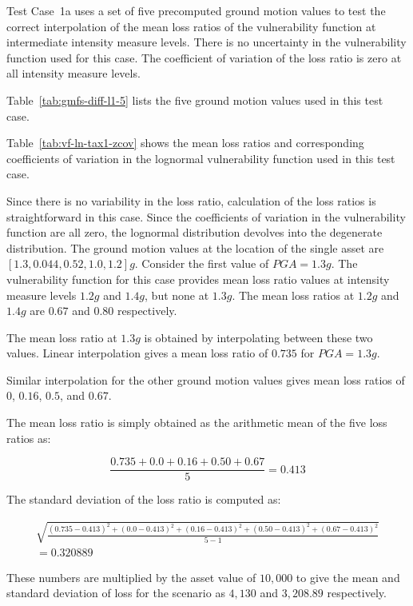 Test Case~1a uses a set of five precomputed ground motion values to test the correct interpolation of the mean loss ratios of the vulnerability function at intermediate intensity measure levels. There is no uncertainty in the vulnerability function used for this case. The coefficient of variation of the loss ratio is zero at all intensity measure levels.



Table~\ref{tab:gmfs-diff-l1-5} lists the five ground motion values used in this test case.



Table~\ref{tab:vf-ln-tax1-zcov} shows the mean loss ratios and corresponding coefficients of variation in the lognormal vulnerability function used in this test case.

Since there is no variability in the loss ratio, calculation of the loss ratios is straightforward in this case. Since the coefficients of variation in the vulnerability function are all zero, the lognormal distribution devolves into the degenerate distribution. The ground motion values at the location of the single asset are $[1.3, 0.044, 0.52, 1.0, 1.2] g$. Consider the first value of $PGA = 1.3 g$. The vulnerability function for this case provides mean loss ratio values at intensity measure levels $1.2 g$ and $1.4 g$, but none at $1.3 g$. The mean loss ratios at $1.2 g$ and $1.4 g$ are $0.67$ and $0.80$ respectively.

The mean loss ratio at $1.3 g$ is obtained by interpolating between these two values. Linear interpolation gives a mean loss ratio of $0.735$ for $PGA = 1.3 g$.

Similar interpolation for the other ground motion values gives mean loss ratios of $0$, $0.16$, $0.5$, and $0.67$.

The mean loss ratio is simply obtained as the arithmetic mean of the five loss ratios as:

\begin{equation*}
\frac{0.735 + 0.0 + 0.16 + 0.50 + 0.67}{5} = 0.413
\end{equation*}

The standard deviation of the loss ratio is computed as:

\begin{multline*}
\sqrt{\frac{(0.735 - 0.413)^2 + (0.0 - 0.413)^2 + (0.16 - 0.413)^2 + (0.50 - 0.413)^2 + (0.67 - 0.413)^2}{5 - 1}} \\
= 0.320889
\end{multline*}

These numbers are multiplied by the asset value of $10,000$ to give the mean and standard deviation of loss for the scenario as $4,130$ and $3,208.89$ respectively.